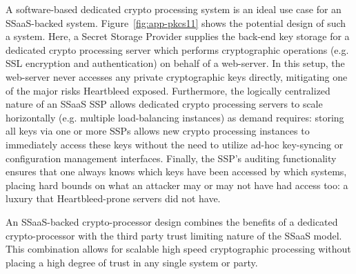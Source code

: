 A software-based dedicated crypto processing system is an ideal use
case for an SSaaS-backed system. Figure~\ref{fig:app-pkcs11} shows the
potential design of such a system. Here, a Secret Storage Provider
supplies the back-end key storage for a dedicated crypto processing
server which performs cryptographic operations (e.g. SSL encryption
and authentication) on behalf of a web-server. In this setup, the
web-server never accesses any private cryptographic keys directly,
mitigating one of the major risks Heartbleed exposed. Furthermore, the
logically centralized nature of an SSaaS SSP allows dedicated crypto
processing servers to scale horizontally (e.g. multiple load-balancing
instances) as demand requires: storing all keys via one or more SSPs
allows new crypto processing instances to immediately access these
keys without the need to utilize ad-hoc key-syncing or configuration
management interfaces. Finally, the SSP's auditing functionality
ensures that one always knows which keys have been accessed by which
systems, placing hard bounds on what an attacker may or may not have
had access too: a luxury that Heartbleed-prone servers did not have.

An SSaaS-backed crypto-processor design combines the benefits of a
dedicated crypto-processor with the third party trust limiting nature
of the SSaaS model. This combination allows for scalable high speed
cryptographic processing without placing a high degree of trust in any
single system or party.

